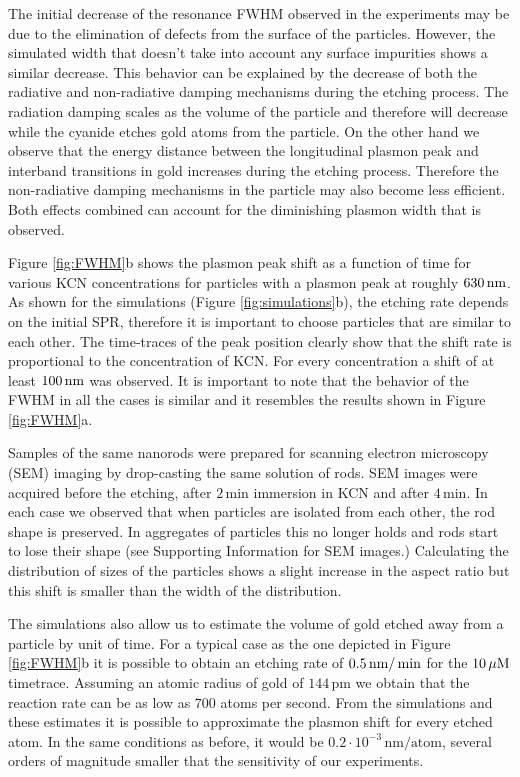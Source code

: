 The initial decrease of the resonance FWHM observed in the experiments may be
due to the elimination of defects from the surface of the particles. However,
the simulated width that doesn't take into account any surface impurities shows
a similar decrease. This behavior can be explained by the decrease of both the
radiative and non-radiative damping mechanisms during the etching
process. The radiation damping scales as the volume of the
particle\cite{Wokaun1982} and therefore will decrease while the cyanide etches
gold atoms from the particle. On the other hand we observe that the energy
distance between the longitudinal plasmon peak and interband transitions in gold
increases during the etching process. Therefore the non-radiative damping
mechanisms in the particle may also become less efficient\cite{Sonnichsen2002}.
Both effects combined can account for the diminishing plasmon width that is observed.

Figure \ref{fig:FWHM}b shows the plasmon peak shift as a function of time for
various KCN concentrations for particles with a plasmon peak at roughly
$630\,\textrm{nm}$. As shown for the simulations (Figure \ref{fig:simulations}b), the
etching rate depends on the initial SPR, therefore it is important to choose
particles that are similar to each other. The time-traces of the peak position
clearly show that the shift rate is proportional to the concentration of KCN.
For every concentration a shift of at least $100\,\textrm{nm}$ was observed. It is
important to note that the behavior of the FWHM in all the cases is similar and
it resembles the results shown in Figure \ref{fig:FWHM}a. 

Samples of the same nanorods were prepared for scanning electron microscopy
(SEM) imaging by drop-casting the same solution of rods. SEM images were acquired
before the etching, after $2\,\textrm{min}$ immersion in KCN and after
$4\,\textrm{min}$. In each case we observed that when particles are isolated
from each other, the rod shape is preserved. In aggregates of particles this no
longer holds and rods start to lose their shape (see Supporting Information for
SEM images.) Calculating the distribution of sizes of the particles shows a
slight increase in the aspect ratio but this shift is smaller than the width of the distribution.

The simulations also allow us to estimate the volume of gold etched away from a
particle by unit of time. For a typical case as the one depicted in Figure
\ref{fig:FWHM}b it is possible to obtain an etching rate of $0.5\,\textrm{nm}/\min$ for
the $10\,\mu\textrm{M}$ timetrace. Assuming an atomic radius of gold of
$144\,\textrm{pm}$\cite{Pauling1947} we obtain that the reaction rate can be as
low as $700$ atoms per second. From the simulations and these estimates it is
possible to approximate the plasmon shift for every etched atom. In the same
conditions as before, it would be $0.2\cdot 10^{-3}\, \textrm{nm}/
\textrm{atom}$, several orders of magnitude smaller that the sensitivity of our
experiments.

